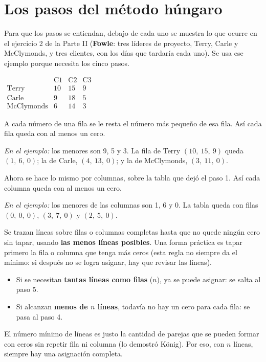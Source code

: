 \documentclass[11pt,a4paper]{article}
\let\pasobase\paso
\renewcommand{\paso}[1]{\needspace{7\baselineskip}\pasobase{#1}}
\begin{document}
\section{Los pasos del método húngaro}\label{sec:algoritmo}

\noindent\begin{minipage}[c]{0.64\textwidth}
Para que los pasos se entiendan, debajo de cada uno se muestra lo que ocurre en el ejercicio 2 de la Parte II
(\textbf{Fowle}: tres líderes de proyecto, Terry, Carle y McClymonds, y tres clientes, con los días que tardaría cada
uno). Se usa ese ejemplo porque necesita los cinco pasos.
\end{minipage}\hfill
\begin{minipage}[c]{0.32\textwidth}\centering\small
$\begin{array}{l|ccc}
 & \text{C1} & \text{C2} & \text{C3}\\ \hline
\text{Terry} & 10 & 15 & 9\\
\text{Carle} & 9 & 18 & 5\\
\text{McClymonds} & 6 & 14 & 3
\end{array}$
\end{minipage}
\par

A cada número de una fila se le resta el número más pequeño de esa fila. Así cada fila queda con al menos un cero.

\textit{En el ejemplo:} los menores son 9, 5 y 3. La fila de Terry $(10,\ 15,\ 9)$ queda $(1,\ 6,\ 0)$; la de Carle,
$(4,\ 13,\ 0)$; y la de McClymonds, $(3,\ 11,\ 0)$.

Ahora se hace lo mismo por columnas, sobre la tabla que dejó el paso 1. Así cada columna queda con al menos un cero.

\textit{En el ejemplo:} los menores de las columnas son 1, 6 y 0. La tabla queda con filas $(0,\ 0,\ 0)$,
$(3,\ 7,\ 0)$ y $(2,\ 5,\ 0)$.

Se trazan líneas sobre filas o columnas completas hasta que no quede ningún cero sin tapar, usando
\textbf{las menos líneas posibles}. Una forma práctica es tapar primero la fila o columna que tenga más ceros
(esta regla no siempre da el mínimo: si después no se logra asignar, hay que revisar las líneas).
\begin{itemize}[itemsep=2pt]
  \item Si se necesitan \textbf{tantas líneas como filas} ($n$), ya se puede asignar: se salta al paso 5.
  \item Si alcanzan \textbf{menos de $n$ líneas}, todavía no hay un cero para cada fila: se pasa al paso 4.
\end{itemize}
El número mínimo de líneas es justo la cantidad de parejas que se pueden formar con ceros sin repetir fila ni
columna (lo demostró König). Por eso, con $n$ líneas, siempre hay una asignación completa.
\end{document}
